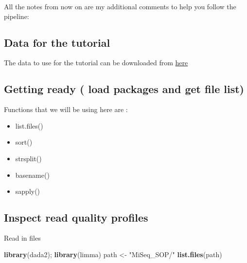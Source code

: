 \documentclass[
]{book}
\newenvironment{Shaded}{\begin{snugshade}}{\end{snugshade}}
\newcommand{\KeywordTok}[1]{\textcolor[rgb]{0.13,0.29,0.53}{\textbf{#1}}}
\newcommand{\NormalTok}[1]{#1}
\newcommand{\StringTok}[1]{\textcolor[rgb]{0.31,0.60,0.02}{#1}}
\providecommand{\tightlist}{%
  \setlength{\itemsep}{0pt}\setlength{\parskip}{0pt}}
\begin{document}
All the notes from now on are my additional comments to help you follow the pipeline:

\hypertarget{data-for-the-tutorial}{%
\subsection{Data for the tutorial}\label{data-for-the-tutorial}}

The data to use for the tutorial can be downloaded from \href{MiSeqSOPData.zip}{here}

\hypertarget{getting-ready-load-packages-and-get-file-list}{%
\subsection{Getting ready ( load packages and get file list)}\label{getting-ready-load-packages-and-get-file-list}}

Functions that we will be using here are :

\begin{itemize}
\tightlist
\item
  list.files()
\item
  sort()
\item
  strsplit()
\item
  basename()
\item
  sapply()
\end{itemize}

\hypertarget{inspect-read-quality-profiles}{%
\subsection{Inspect read quality profiles}\label{inspect-read-quality-profiles}}

Read in files

\begin{Shaded}
\begin{Highlighting}[]
\KeywordTok{library}\NormalTok{(dada2);}
\KeywordTok{library}\NormalTok{(limma)}
\NormalTok{path <-}\StringTok{ "MiSeq_SOP/"}
\KeywordTok{list.files}\NormalTok{(path)}
\end{Highlighting}
\end{Shaded}
\end{document}
